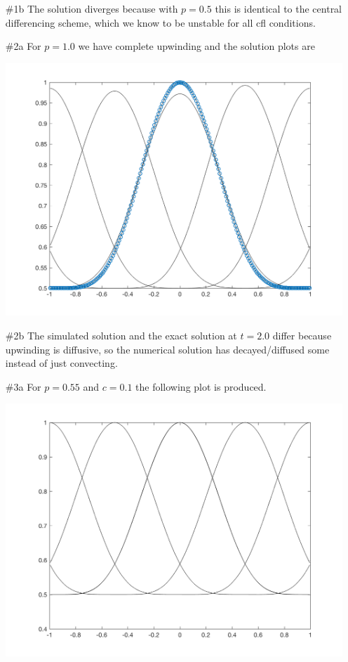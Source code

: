 \documentclass[11pt, oneside]{article}
\begin{document}
\begin{enumerate}
\begin{enumerate}
      \item[\#1b]
        The solution diverges because with $p = 0.5$ this is identical to the
        central differencing scheme, which we know to be unstable for all cfl
        conditions.

      \item[\#2a]
        For $p = 1.0$ we have complete upwinding and the solution plots are
        \begin{center}
          \includegraphics[scale=0.5]{Figures/08_03.png}
        \end{center}

      \item[\#2b]
        The simulated solution and the exact solution at $t = 2.0$ differ
        because upwinding is diffusive, so the numerical solution has
        decayed/diffused some instead of just convecting.

      \item[\#3a]
        For $p = 0.55$ and $c = 0.1$ the following plot is produced.
        \begin{center}
          \includegraphics[scale=0.5]{Figures/08_04.png}
        \end{center}


\end{enumerate}
\end{enumerate}
\end{document}
